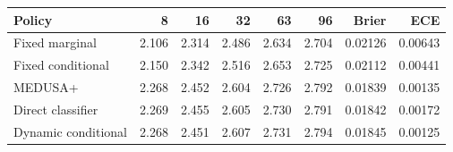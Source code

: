 \begin{center}
\begin{tabular}{lrrrrrrr}
\toprule
Policy & 8 & 16 & 32 & 63 & 96 & Brier & ECE\\
\midrule
Fixed marginal & 2.106 & 2.314 & 2.486 & 2.634 & 2.704 & 0.02126 & 0.00643\\
Fixed conditional & 2.150 & 2.342 & 2.516 & 2.653 & 2.725 & 0.02112 & 0.00441\\
MEDUSA+ & 2.268 & 2.452 & 2.604 & 2.726 & 2.792 & 0.01839 & 0.00135\\
Direct classifier & 2.269 & 2.455 & 2.605 & 2.730 & 2.791 & 0.01842 & 0.00172\\
Dynamic conditional & 2.268 & 2.451 & 2.607 & 2.731 & 2.794 & 0.01845 & 0.00125\\
\bottomrule
\end{tabular}
\end{center}
